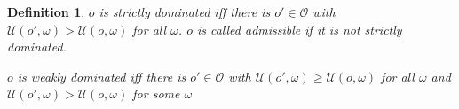 \documentclass[a4paper]{article}
\newtheorem{definition}{Definition}
\renewcommand\O{\mathcal{O}}
\newcommand\Uwald{\mathcal{U}} %
\renewcommand{\geq}{\geqslant}
\newenvironment{CCM rewritten}
{\begingroup\color{blue}} %
{\endgroup}              %
\begin{document}
\begin{definition}
	$o$ is \emph{strictly dominated} iff there is $o'\in\O$ with $\Uwald(o',\omega)>\Uwald(o,\omega)$ for all $\omega$. $o$ is called \emph{admissible} if it is not strictly dominated. 
	
	$o$ is \emph{weakly dominated} iff there is $o'\in\O$ with $\Uwald(o',\omega)\geq\Uwald(o,\omega)$ for all $\omega$ and $\Uwald(o',\omega)>\Uwald(o,\omega)$ for some $\omega$ 
\end{definition}






	
	
\end{document}
